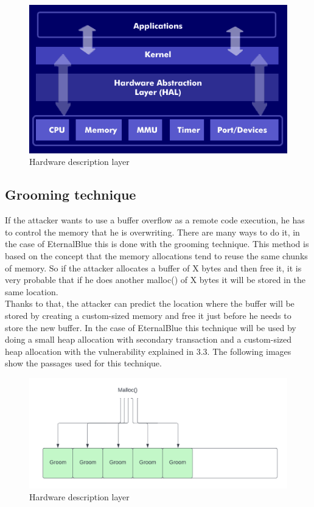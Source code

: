 \begin{figure}[ht!]
    \centering
      \includegraphics[scale=0.5]{images/hal.png}
      \caption{Hardware description layer}
\end{figure}

\clearpage

\subsection{Grooming technique}
If the attacker wants to use a buffer overflow as a remote code execution, he has to control the memory that he is overwriting. There are many ways to do it, in 
the case of EternalBlue this is done with the grooming technique. This method is based on the concept that the memory allocations tend to reuse the same chunks of memory. So if the 
attacker allocates a buffer of X bytes and then free it, it is very probable that if he does another malloc() of X bytes it will be stored in the same location.\\
Thanks to that, the attacker can predict the location where the buffer will be stored by creating a custom-sized memory and free it just before he needs to store the new buffer. In the case of 
EternalBlue this technique will be used by doing a small heap allocation with secondary transaction and a custom-sized heap allocation with the vulnerability explained in 3.3.
The following images show the passages used for this technique.

\begin{figure}[ht!]
    \centering
      \includegraphics[scale=0.5]{images/grooming_malloc.png}
      \caption{Hardware description layer}
\end{figure}

